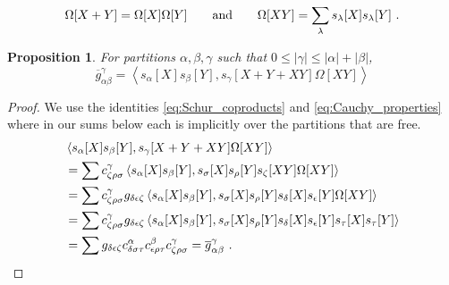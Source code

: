 \documentclass[10pt,a4paper]{amsart}
\newtheorem{prop}{Proposition}
\begin{document}
\begin{equation}\label{eq:Cauchy_properties}
\Omega[X+Y] = \Omega[X]\Omega[Y]\qquad\hbox{and}\qquad\Omega[XY] = \sum_{\lambda} s_\lambda[X] s_\lambda[Y]~.
\end{equation}

\begin{prop}
\label{prop:pleth_irred_structure}
For partitions $\alpha, \beta, \gamma$ such that $0 \leq |\gamma| \leqslant |\alpha|+|\beta|$,
\[
\overline{g}_{\alpha\beta}^\gamma = \left< s_\alpha[X] s_\beta[Y], s_\gamma[X+Y+XY] \Omega[XY] \right>
\]
\end{prop}

\begin{proof} We use the identities \eqref{eq:Schur_coproducts}
and \eqref{eq:Cauchy_properties}
where in our sums below each is implicitly over the partitions that are free.
\begin{align*}
&\left< s_\alpha[X] s_\beta[Y], s_\gamma[X+Y+XY] \Omega[XY] \right>\\
&=\sum c^\gamma_{\zeta\rho\sigma} \left< s_\alpha[X] s_\beta[Y], s_\sigma[X]s_\rho[Y]s_\zeta[XY] \Omega[XY] \right>\\
&= \sum c^\gamma_{\zeta\rho\sigma}
g_{\delta\epsilon\zeta} \left< s_\alpha[X] s_\beta[Y], s_\sigma[X]s_\rho[Y]s_\delta[X]s_\epsilon[Y] \Omega[XY] \right>\\
&= \sum c^\gamma_{\zeta\rho\sigma}
g_{\delta\epsilon\zeta} \left< s_\alpha[X] s_\beta[Y], s_\sigma[X]s_\rho[Y]s_\delta[X]s_\epsilon[Y] s_\tau[X] s_\tau[Y] \right>\\
&=\sum
g_{\delta\epsilon\zeta} c^\alpha_{\delta\sigma\tau} c^\beta_{\epsilon\rho\tau} c^\gamma_{\zeta\rho\sigma}
= \overline{g}_{\alpha\beta}^\gamma~. \qedhere
\end{align*}
\end{proof}
\end{document}

